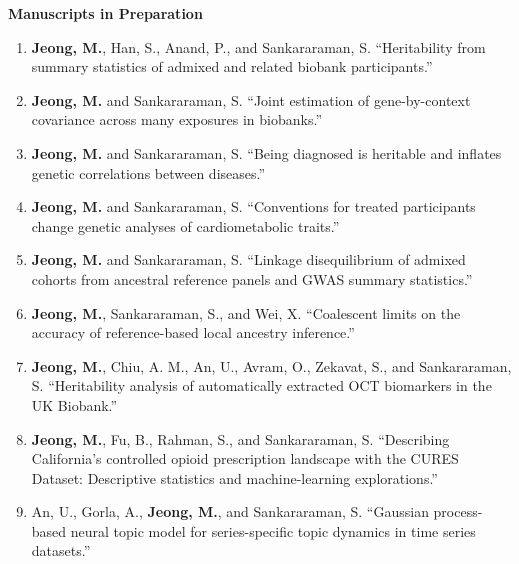\documentclass[10pt,letterpaper]{article}
\begin{document}
\textbf{Manuscripts in Preparation}
\begin{enumerate}[resume]
\item \textbf{Jeong, M.}, Han, S., Anand, P., and Sankararaman, S. ``Heritability from summary statistics of admixed and related biobank participants.''
\item \textbf{Jeong, M.} and Sankararaman, S. ``Joint estimation of gene-by-context covariance across many exposures in biobanks.''
\item \textbf{Jeong, M.} and Sankararaman, S. ``Being diagnosed is heritable and inflates genetic correlations between diseases.''
\item \textbf{Jeong, M.} and Sankararaman, S. ``Conventions for treated participants change genetic analyses of cardiometabolic traits.''
\item \textbf{Jeong, M.} and Sankararaman, S. ``Linkage disequilibrium of admixed cohorts from ancestral reference panels and GWAS summary statistics.''
\item \textbf{Jeong, M.}, Sankararaman, S., and Wei, X. ``Coalescent limits on the accuracy of reference-based local ancestry inference.''
\item \textbf{Jeong, M.}, Chiu, A. M., An, U., Avram, O., Zekavat, S., and Sankararaman, S. ``Heritability analysis of automatically extracted OCT biomarkers in the UK Biobank.''
\item \textbf{Jeong, M.}, Fu, B., Rahman, S., and Sankararaman, S. ``Describing California's controlled opioid prescription landscape with the CURES Dataset: Descriptive statistics and machine-learning explorations.''
\item An, U., Gorla, A., \textbf{Jeong, M.}, and Sankararaman, S. ``Gaussian process-based neural topic model for series-specific topic dynamics in time series datasets.''
\end{enumerate}
\end{document}
